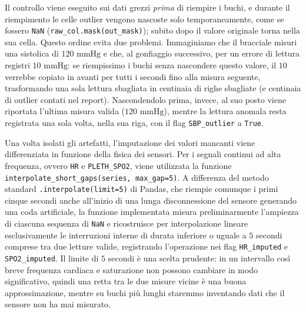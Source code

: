 Il controllo viene eseguito sui dati grezzi \textit{prima} di riempire i buchi, e durante il riempimento le celle outlier vengono nascoste solo temporaneamente, come se fossero \texttt{NaN} (\texttt{raw\_col.mask(out\_mask)}); subito dopo il valore originale torna nella sua cella. Questo ordine evita due problemi. Immaginiamo che il bracciale misuri una sistolica di $120\text{ mmHg}$ e che, al gonfiaggio successivo, per un errore di lettura registri $10\text{ mmHg}$: se riempissimo i buchi senza nascondere questo valore, il $10$ verrebbe copiato in avanti per tutti i secondi fino alla misura seguente, trasformando una sola lettura sbagliata in centinaia di righe sbagliate (e centinaia di outlier contati nel report). Nascondendolo prima, invece, al suo posto viene riportata l'ultima misura valida ($120\text{ mmHg}$), mentre la lettura anomala resta registrata una sola volta, nella sua riga, con il flag \texttt{SBP\_outlier} a \texttt{True}.

Una volta isolati gli artefatti, l'imputazione dei valori mancanti viene differenziata in funzione della fisica dei sensori. Per i segnali continui ad alta frequenza, ovvero \texttt{HR} e \texttt{PLETH\_SPO2}, viene utilizzata la funzione \texttt{interpolate\_short\_gaps(series, max\_gap=5)}. A differenza del metodo standard \texttt{.interpolate(limit=5)} di Pandas, che riempie comunque i primi cinque secondi anche all'inizio di una lunga disconnessione del sensore generando una coda artificiale, la funzione implementata misura preliminarmente l'ampiezza di ciascuna sequenza di \texttt{NaN} e ricostruisce per interpolazione lineare esclusivamente le interruzioni interne di durata inferiore o uguale a $5$ secondi comprese tra due letture valide, registrando l'operazione nei flag \texttt{HR\_imputed} e \texttt{SPO2\_imputed}. Il limite di $5$ secondi \`e una scelta prudente: in un intervallo cos\`i breve frequenza cardiaca e saturazione non possono cambiare in modo significativo, quindi una retta tra le due misure vicine \`e una buona approssimazione, mentre su buchi pi\`u lunghi staremmo inventando dati che il sensore non ha mai misurato.


